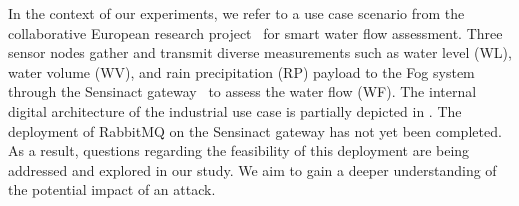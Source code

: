 
In the context of our experiments, we refer to a use case scenario from the collaborative European research project~\cite{brainiot2022} for smart water flow assessment. Three sensor nodes gather and transmit diverse measurements such as water level (WL), water volume (WV), and rain precipitation (RP) payload to the Fog system through 
the Sensinact gateway~\cite{sensinactref2024} to assess the water flow (WF). The internal digital architecture of the industrial use case is partially depicted in . 
The deployment of RabbitMQ on the Sensinact gateway has not yet been completed. As a result, questions regarding the feasibility of this deployment are being addressed and explored in our study. 
We aim to gain a deeper understanding of the potential impact of an attack.  


